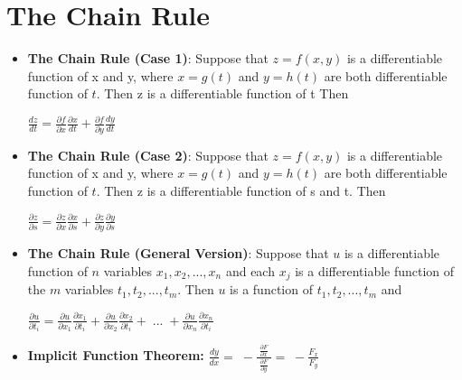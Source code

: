 \documentclass{report}
\begin{document}
	\section{The Chain Rule}
		\begin{itemize}\addtolength{\leftskip}{2em}
			\item \textbf{The Chain Rule (Case 1)}: Suppose that $z=f(x,y)$ is a differentiable function of x and y, where $x=g(t)$ and $y=h(t)$ are both differentiable function of $t$. Then z is a differentiable function of t Then
			\begin{center}
				\huge$\frac{dz}{dt}=\frac{\partial f}{\partial x}\frac{\partial x}{dt}+\frac{\partial f}{\partial y}\frac{dy}{dt}$
			\end{center}
			 
			\item \textbf{The Chain Rule (Case 2)}: Suppose that $z=f(x,y)$ is a differentiable function of x and y, where $x=g(t)$ and $y=h(t)$ are both differentiable function of $t$. Then z is a differentiable function of s and t. Then
			\begin{center}
				\huge$\frac{\partial z}{\partial s}=\frac{\partial z}{\partial x}\frac{\partial x}{\partial s}+\frac{\partial z}{\partial y}\frac{\partial y}{\partial s}$
			\end{center}
			
			\item \textbf{The Chain Rule (General Version)}: Suppose that $u$ is a differentiable function of $n$ variables $x_1,x_2,...,x_n$ and each $x_j$ is a differentiable function of the $m$ variables $t_1,t_2,...,t_m$. Then $u$ is a function of $t_1,t_2,...,t_m$ and
			\begin{center}
				\huge$\frac{\partial u}{\partial t_i}=\frac{\partial u}{\partial x_1}\frac{\partial x_1}{\partial t_i}+\frac{\partial u}{\partial  x_2}\frac{\partial x_2}{\partial t_i}+\;...\;+\frac{\partial u}{\partial x_n}\frac{\partial x_n}{\partial t_i}$
			\end{center}
			\item \textbf{Implicit Function Theorem:} 
			\subitem \huge $\frac{dy}{dx}=\;-\frac{\;\frac{\partial F}{\partial x}\;}{\;\frac{\partial F}{\partial y}\;}=\;-\frac{F_x}{F_y}$
		\end{itemize}
\end{document}
